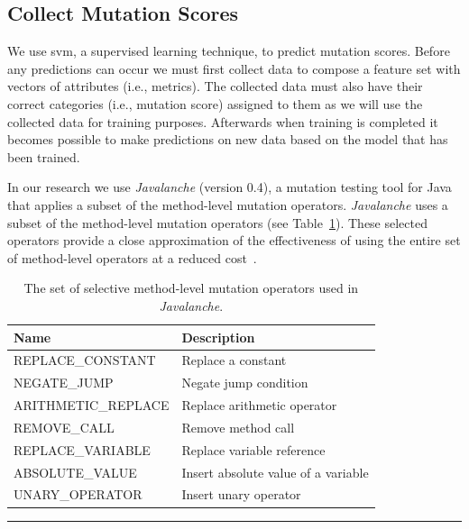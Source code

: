 \subsection{Collect Mutation Scores}
\label{subsec:approach_collect_mutation_scores}
We use \gls{svm}, a supervised learning technique, to predict mutation scores. Before any predictions can occur we must first collect data to compose a feature set with vectors of attributes (i.e., metrics). The collected data must also have their correct categories (i.e., mutation score) assigned to them as we will use the collected data for training purposes. Afterwards when training is completed it becomes possible to make predictions on new data based on the model that has been trained.

In our research we use \emph{Javalanche} (version 0.4), a mutation testing tool for Java~\cite{SZ09} that applies a subset of the method-level mutation operators. \emph{Javalanche} uses a subset of the method-level mutation operators (see Table~\ref{tab:javalanche_operators}). These selected operators provide a close approximation of the effectiveness of using the entire set of method-level operators at a reduced cost~\cite{OLR+96}.

\begin{table}[!tb]
  \centering
  \begin{tabular}{|l|l|}
    \hline
    \rowcolor[RGB]{169,196,223}
    \textbf{Name} & \textbf{Description} \\
    \hline REPLACE\_CONSTANT & Replace a constant \\
    \hline NEGATE\_JUMP & Negate jump condition \\
    \hline ARITHMETIC\_REPLACE & Replace arithmetic operator \\
    \hline REMOVE\_CALL & Remove method call \\
    \hline REPLACE\_VARIABLE & Replace variable reference\\
    \hline ABSOLUTE\_VALUE & Insert absolute value of a variable \\
    \hline UNARY\_OPERATOR & Insert unary operator \\
    \hline
  \end{tabular}
  \caption{The set of selective method-level mutation operators used in \emph{Javalanche}.}
  \label{tab:javalanche_operators}
  \vspace{2mm}
  \hrule
\end{table}

